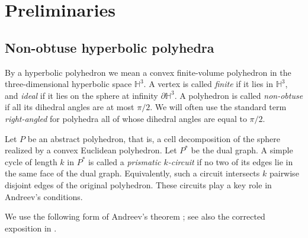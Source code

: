 \documentclass[12pt,a4paper]{article}
\theoremstyle{definition}
\newcommand{\HH}{\mathbb H}
\begin{document}
\section{Preliminaries}

\subsection{Non-obtuse hyperbolic polyhedra}

By a hyperbolic polyhedron we mean a convex finite-volume polyhedron in the three-dimensional hyperbolic space \(\HH^3\). A vertex is called \emph{finite} if it lies in \(\HH^3\), and \emph{ideal} if it lies on the sphere at infinity \(\partial\HH^3\). A polyhedron is called \emph{non-obtuse} if all its dihedral angles are at most \(\pi/2\). We will often use the standard term \emph{right-angled} for polyhedra all of whose dihedral angles are equal to \(\pi/2\).

Let \(P\) be an abstract polyhedron, that is, a cell decomposition of the sphere realized by a convex Euclidean polyhedron. Let \(P^*\) be the dual graph. A simple cycle of length \(k\) in \(P^*\) is called a \emph{prismatic \(k\)-circuit} if no two of its edges lie in the same face of the dual graph. Equivalently, such a circuit intersects \(k\) pairwise disjoint edges of the original polyhedron. These circuits play a key role in Andreev's conditions.

We use the following form of Andreev's theorem \cite{AndreevCompact,AndreevFinite}; see also the corrected exposition in \cite{RHD}.
\end{document}
